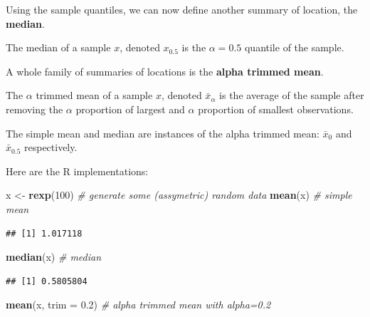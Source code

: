 \documentclass[]{book}
\newenvironment{Shaded}{\begin{snugshade}}{\end{snugshade}}
\newcommand{\CommentTok}[1]{\textcolor[rgb]{0.56,0.35,0.01}{\textit{#1}}}
\newcommand{\DataTypeTok}[1]{\textcolor[rgb]{0.13,0.29,0.53}{#1}}
\newcommand{\DecValTok}[1]{\textcolor[rgb]{0.00,0.00,0.81}{#1}}
\newcommand{\FloatTok}[1]{\textcolor[rgb]{0.00,0.00,0.81}{#1}}
\newcommand{\KeywordTok}[1]{\textcolor[rgb]{0.13,0.29,0.53}{\textbf{#1}}}
\newcommand{\NormalTok}[1]{#1}
\newcommand{\StringTok}[1]{\textcolor[rgb]{0.31,0.60,0.02}{#1}}
\theoremstyle{definition}
\theoremstyle{definition}
\theoremstyle{definition}
\theoremstyle{remark}
\let\BeginKnitrBlock\begin \let\EndKnitrBlock\end
\begin{document}
Using the sample quantiles, we can now define another summary of location, the \textbf{median}.

\BeginKnitrBlock{definition}[Median]
\protect\hypertarget{def:unnamed-chunk-115}{}{\label{def:unnamed-chunk-115} {} }The median of a sample \(x\), denoted \(x_{0.5}\) is the \(\alpha=0.5\) quantile of the sample.
\EndKnitrBlock{definition}

A whole family of summaries of locations is the \textbf{alpha trimmed mean}.

\BeginKnitrBlock{definition}[Alpha Trimmed Mean]
\protect\hypertarget{def:unnamed-chunk-116}{}{\label{def:unnamed-chunk-116} {} }The \(\alpha\) trimmed mean of a sample \(x\), denoted \(\bar x_\alpha\) is the average of the sample after removing the \(\alpha\) proportion of largest and \(\alpha\) proportion of smallest observations.
\EndKnitrBlock{definition}

The simple mean and median are instances of the alpha trimmed mean: \(\bar x_0\) and \(\bar x_{0.5}\) respectively.

Here are the R implementations:

\begin{Shaded}
\begin{Highlighting}[]
\NormalTok{x <-}\StringTok{ }\KeywordTok{rexp}\NormalTok{(}\DecValTok{100}\NormalTok{) }\CommentTok{# generate some (assymetric) random data}
\KeywordTok{mean}\NormalTok{(x) }\CommentTok{# simple mean}
\end{Highlighting}
\end{Shaded}

\begin{verbatim}
## [1] 1.017118
\end{verbatim}

\begin{Shaded}
\begin{Highlighting}[]
\KeywordTok{median}\NormalTok{(x) }\CommentTok{# median}
\end{Highlighting}
\end{Shaded}

\begin{verbatim}
## [1] 0.5805804
\end{verbatim}

\begin{Shaded}
\begin{Highlighting}[]
\KeywordTok{mean}\NormalTok{(x, }\DataTypeTok{trim =} \FloatTok{0.2}\NormalTok{) }\CommentTok{# alpha trimmed mean with alpha=0.2}
\end{Highlighting}
\end{Shaded}
\end{document}
